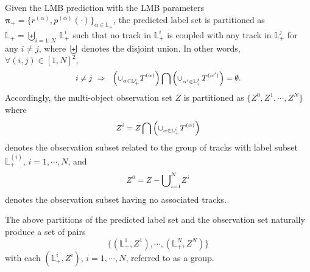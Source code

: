 \documentclass[journal]{IEEEtran}
\newcommand{\bpi}{{\boldsymbol\pi}}
\begin{document}
{ Given the LMB prediction with the LMB parameters $\bpi_+=\{r^{(\alpha)},p^{(\alpha)}(\cdot)\}_{\alpha\in\mathbb{L}_+}$,  the predicted label set is partitioned as $\mathbb{L}_+ = \biguplus_{i=1:N}\ \mathbb{L}_+^{i}$ such that no track in $\mathbb{L}_+^{i}$ is coupled with any track in $\mathbb{L}_+^{j}$ for any $i\neq j$, where $\biguplus$ denotes the disjoint union.  In other words, $\forall (i,j)\in[1,N]^2$,
\begin{equation}\label{grouping-c}
{\small
\begin{split}
 i\neq j\ \Rightarrow \ \ \left(\cup_{\alpha\in\mathbb{L}_+^{i}}T^{(\alpha)}\right)\bigcap \left(\cup_{\alpha'\in\mathbb{L}_+^{j}}T^{(\alpha')}\right)=\emptyset.
 \end{split}}
\end{equation}
Accordingly,  the multi-object observation set $Z$ is partitioned as $\{Z^{0},Z^{1},\cdots, Z^{N}\}$ where 
\begin{equation}\label{grouping-Z-1}
{\small
\begin{split}
Z^{i}=Z\bigcap\left(\cup_{\alpha\in\mathbb{L}^{i}_+}T^{(\alpha)}\right)
\end{split}}
\end{equation}
  denotes the observation subset related to the group of tracks with label subset $\mathbb{L}_+^{(i)}$,  $i=1,\cdots,N$, and 
\begin{equation}\label{grouping-Z-2}
{\small
\begin{split}
Z^{0}=Z-{\bigcup}_{i=1}^N Z^{i}
\end{split}}
\end{equation}
 denotes the observation subset  having no associated tracks.

The above partitions of the predicted label set and the observation set naturally produce a set of  pairs $$\{(\mathbb{L}^{1}_+,Z^{1}),\cdots,(\mathbb{L}_+^{N},Z^{N})\}$$ with each $(\mathbb{L}^{i}_+,Z^{i})$, $i=1,\cdots,N$,  referred to as a group. 


}
\end{document}
